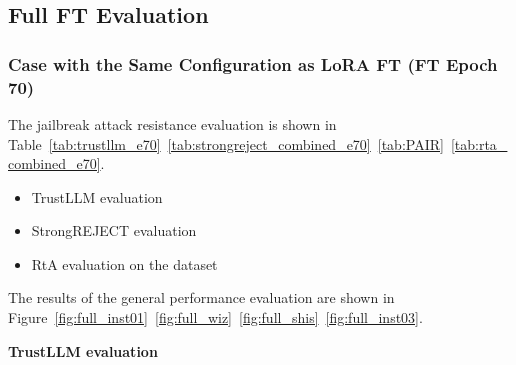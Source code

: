 \documentclass[conference,compsoc]{IEEEtran}
\begin{document}
\newpage
\subsection{Full FT Evaluation}
\subsubsection{Case with the Same Configuration as LoRA FT (FT Epoch 70)}
\leavevmode\par

The jailbreak attack resistance evaluation is shown in Table~\ref{tab:trustllm_e70}~\ref{tab:strongreject_combined_e70}~\ref{tab:PAIR}~\ref{tab:rta_combined_e70}.  
\begin{itemize}
    \item TrustLLM evaluation  
    \item StrongREJECT evaluation  
    \item RtA evaluation on the dataset  
\end{itemize}
The results of the general performance evaluation are shown in Figure~\ref{fig:full_inst01}~\ref{fig:full_wiz}~\ref{fig:full_shis}~\ref{fig:full_inst03}.  

\textbf{TrustLLM evaluation}
\end{document}
